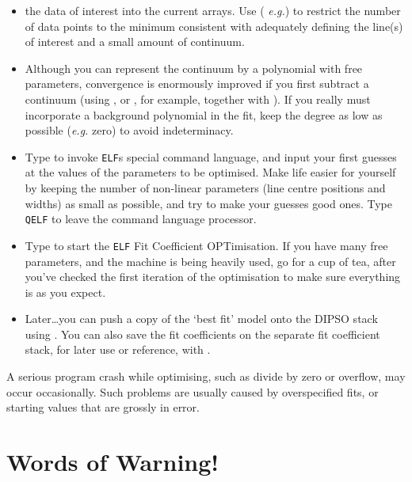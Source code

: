 \begin{itemize}

\item {}  the data of interest into the current arrays. Use ({\em
e.g.})   to restrict the number of data points to the minimum
consistent with adequately defining the line(s) of interest and a
small amount of continuum.

\item Although you can represent the continuum by a polynomial with
free parameters, convergence is enormously improved if you first
subtract a continuum (using ,  or ,  for example,
together with ).  If you really must incorporate a background
polynomial in the fit, keep the degree as low as possible ({\em e.g.}
zero) to avoid indeterminacy.

\item Type   to invoke {\tt{ELF}}s  special command language,
and input your first guesses at the values of the parameters to be
optimised. Make life easier for yourself by keeping the number of
non-linear parameters (line centre positions and widths) as small as
possible, and try to make your guesses good ones. Type {\tt{QELF}}  to
leave the command language processor.

\item Type   to start the {\tt{ELF}}  Fit Coefficient
OPTimisation. If you have many free parameters, and the machine is
being heavily used, go for a cup of tea, after you've checked the
first iteration of the optimisation to make sure everything is as you
expect.

\item Later\ldots you can push a copy of the `best fit' model onto the
DIPSO stack using .  You can also save the fit
coefficients on the separate fit coefficient stack, for later use or
reference, with . 

\end{itemize}

A serious program crash while optimising, such as divide by zero or
overflow, may occur occasionally. Such problems are usually caused by
overspecified fits, or starting values that are grossly in error.

\section {Words of Warning!}

